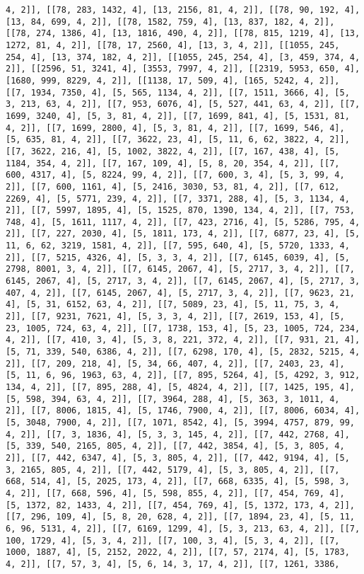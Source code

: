 \documentclass[12pt,fleqn]{article}\usepackage{../../common}
\begin{document}
\begin{verbatim}
4, 2]], [[78, 283, 1432, 4], [13, 2156, 81, 4, 2]], [[78, 90, 192, 4], [13, 84, 699, 4, 2]], [[78, 1582, 759, 4], [13, 837, 182, 4, 2]], [[78, 274, 1386, 4], [13, 1816, 490, 4, 2]], [[78, 815, 1219, 4], [13, 1272, 81, 4, 2]], [[78, 17, 2560, 4], [13, 3, 4, 2]], [[1055, 245, 254, 4], [13, 374, 182, 4, 2]], [[1055, 245, 254, 4], [3, 459, 374, 4, 2]], [[2596, 51, 3241, 4], [3553, 7997, 4, 2]], [[2319, 5953, 650, 4], [1680, 999, 8229, 4, 2]], [[1138, 17, 509, 4], [165, 5242, 4, 2]], [[7, 1934, 7350, 4], [5, 565, 1134, 4, 2]], [[7, 1511, 3666, 4], [5, 3, 213, 63, 4, 2]], [[7, 953, 6076, 4], [5, 527, 441, 63, 4, 2]], [[7, 1699, 3240, 4], [5, 3, 81, 4, 2]], [[7, 1699, 841, 4], [5, 1531, 81, 4, 2]], [[7, 1699, 2800, 4], [5, 3, 81, 4, 2]], [[7, 1699, 546, 4], [5, 635, 81, 4, 2]], [[7, 3622, 23, 4], [5, 11, 6, 62, 3822, 4, 2]], [[7, 3622, 216, 4], [5, 1002, 3822, 4, 2]], [[7, 167, 438, 4], [5, 1184, 354, 4, 2]], [[7, 167, 109, 4], [5, 8, 20, 354, 4, 2]], [[7, 600, 4317, 4], [5, 8224, 99, 4, 2]], [[7, 600, 3, 4], [5, 3, 99, 4, 2]], [[7, 600, 1161, 4], [5, 2416, 3030, 53, 81, 4, 2]], [[7, 612, 2269, 4], [5, 5771, 239, 4, 2]], [[7, 3371, 288, 4], [5, 3, 1134, 4, 2]], [[7, 5997, 1895, 4], [5, 1525, 870, 1390, 134, 4, 2]], [[7, 753, 748, 4], [5, 1611, 1117, 4, 2]], [[7, 423, 2716, 4], [5, 5286, 795, 4, 2]], [[7, 227, 2030, 4], [5, 1811, 173, 4, 2]], [[7, 6877, 23, 4], [5, 11, 6, 62, 3219, 1581, 4, 2]], [[7, 595, 640, 4], [5, 5720, 1333, 4, 2]], [[7, 5215, 4326, 4], [5, 3, 3, 4, 2]], [[7, 6145, 6039, 4], [5, 2798, 8001, 3, 4, 2]], [[7, 6145, 2067, 4], [5, 2717, 3, 4, 2]], [[7, 6145, 2067, 4], [5, 2717, 3, 4, 2]], [[7, 6145, 2067, 4], [5, 2717, 3, 407, 4, 2]], [[7, 6145, 2067, 4], [5, 2717, 3, 4, 2]], [[7, 9623, 21, 4], [5, 31, 6152, 63, 4, 2]], [[7, 5089, 23, 4], [5, 11, 75, 3, 4, 2]], [[7, 9231, 7621, 4], [5, 3, 3, 4, 2]], [[7, 2619, 153, 4], [5, 23, 1005, 724, 63, 4, 2]], [[7, 1738, 153, 4], [5, 23, 1005, 724, 234, 4, 2]], [[7, 410, 3, 4], [5, 3, 8, 221, 372, 4, 2]], [[7, 931, 21, 4], [5, 71, 339, 540, 6386, 4, 2]], [[7, 6298, 170, 4], [5, 2832, 5215, 4, 2]], [[7, 209, 218, 4], [5, 34, 66, 407, 4, 2]], [[7, 2403, 23, 4], [5, 11, 6, 96, 1963, 63, 4, 2]], [[7, 895, 5264, 4], [5, 4292, 3, 912, 134, 4, 2]], [[7, 895, 288, 4], [5, 4824, 4, 2]], [[7, 1425, 195, 4], [5, 598, 394, 63, 4, 2]], [[7, 3964, 288, 4], [5, 363, 3, 1011, 4, 2]], [[7, 8006, 1815, 4], [5, 1746, 7900, 4, 2]], [[7, 8006, 6034, 4], [5, 3048, 7900, 4, 2]], [[7, 1071, 8542, 4], [5, 3994, 4757, 879, 99, 4, 2]], [[7, 3, 1836, 4], [5, 3, 3, 145, 4, 2]], [[7, 442, 2768, 4], [5, 339, 540, 2165, 805, 4, 2]], [[7, 442, 3854, 4], [5, 3, 805, 4, 2]], [[7, 442, 6347, 4], [5, 3, 805, 4, 2]], [[7, 442, 9194, 4], [5, 3, 2165, 805, 4, 2]], [[7, 442, 5179, 4], [5, 3, 805, 4, 2]], [[7, 668, 514, 4], [5, 2025, 173, 4, 2]], [[7, 668, 6335, 4], [5, 598, 3, 4, 2]], [[7, 668, 596, 4], [5, 598, 855, 4, 2]], [[7, 454, 769, 4], [5, 1372, 82, 1433, 4, 2]], [[7, 454, 769, 4], [5, 1372, 173, 4, 2]], [[7, 296, 109, 4], [5, 8, 20, 628, 4, 2]], [[7, 1894, 23, 4], [5, 11, 6, 96, 5131, 4, 2]], [[7, 6169, 1299, 4], [5, 3, 213, 63, 4, 2]], [[7, 100, 1729, 4], [5, 3, 4, 2]], [[7, 100, 3, 4], [5, 3, 4, 2]], [[7, 1000, 1887, 4], [5, 2152, 2022, 4, 2]], [[7, 57, 2174, 4], [5, 1783, 4, 2]], [[7, 57, 3, 4], [5, 6, 14, 3, 17, 4, 2]], [[7, 1261, 3386, 
\end{verbatim}
\end{document}
